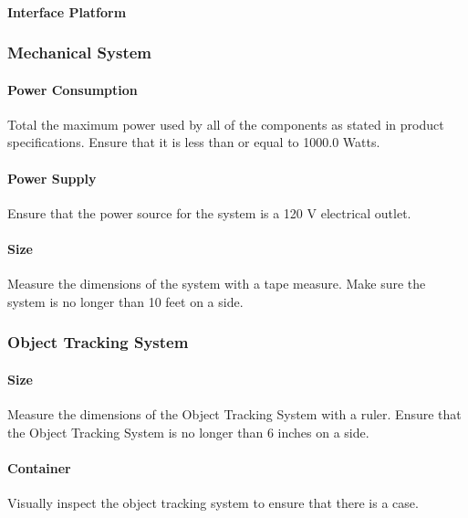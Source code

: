 \paragraph{Interface Platform}

\subsubsection{Mechanical System}

\paragraph{Power Consumption}
Total the maximum power used by all of the components as stated in product specifications. Ensure that it is less than or equal to 1000.0 Watts. 

\paragraph{Power Supply}
Ensure that the power source for the system is a 120 V electrical outlet. 

\paragraph{Size}
Measure the dimensions of the system with a tape measure. Make sure the system is no longer than 10 feet on a side. 

\subsubsection{Object Tracking System}

\paragraph{Size}
Measure the dimensions of the Object Tracking System with a ruler. Ensure that the Object Tracking System is no longer than 6 inches on a side. 

\paragraph{Container}
Visually inspect the object tracking system to ensure that there is a case. 

